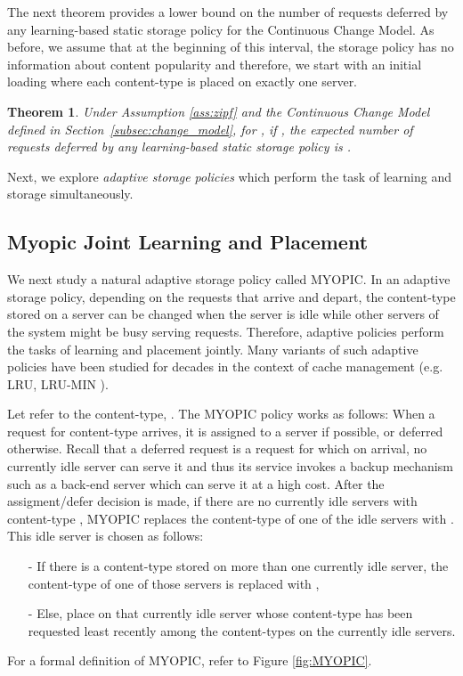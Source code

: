 \documentclass[10pt, conference, letterpaper]{IEEEtran}
\newtheorem{theorem}{Theorem}
\begin{document}
The next theorem provides a lower bound on the number of requests deferred by any learning-based static storage policy for the Continuous Change Model.  As before, we assume that at the beginning of this interval, the storage policy has no information about content popularity and therefore, we start with an initial loading where each content-type is placed on exactly one server.

\begin{theorem}
	\label{thm:converse_2}
	Under Assumption \ref{ass:zipf} and the Continuous Change Model defined in
	Section~\ref{subsec:change_model}, for , if , the expected number
	of requests deferred by any learning-based static storage policy is
	.
\end{theorem}



Next, we explore \textit{adaptive storage policies} which perform the
task of learning and storage simultaneously.


\subsection{Myopic Joint Learning and Placement}
\label{subsec:MYOPIC}
We next study a natural adaptive storage policy called MYOPIC. In an
adaptive storage policy, depending on the requests that arrive and
depart, the content-type stored on a server can be changed when the server
is idle while other servers of the system might be busy serving
requests. Therefore, adaptive policies perform the tasks of learning
and placement jointly. Many variants of such adaptive policies have
been studied for decades in the context of cache management (e.g. LRU,
LRU-MIN \cite{LRU-MIN95}).


Let  refer to the  content-type, . The
MYOPIC policy works as follows: When a request for content-type 
arrives, it is assigned to a server if possible, or deferred
otherwise. Recall that a deferred request is a request for which on
arrival, no currently idle server can serve it and thus its service
invokes a backup mechanism such as a back-end server which can serve
it at a high cost. After the assigment/defer decision is made, if
there are no currently idle servers with content-type , MYOPIC
replaces the content-type of one of the idle servers with . This idle
server is chosen as follows:
\begin{itemize}
	\item[-] If there is a content-type  stored on more than one currently
	idle server, the content-type of one of those servers is replaced with
	,
	\item[-] Else, place  on that currently idle server whose content-type
	has been requested least recently among the content-types on the
	currently idle servers.
\end{itemize}
\noindent For a formal definition of MYOPIC, refer to Figure \ref{fig:MYOPIC}.\\
\end{document}

